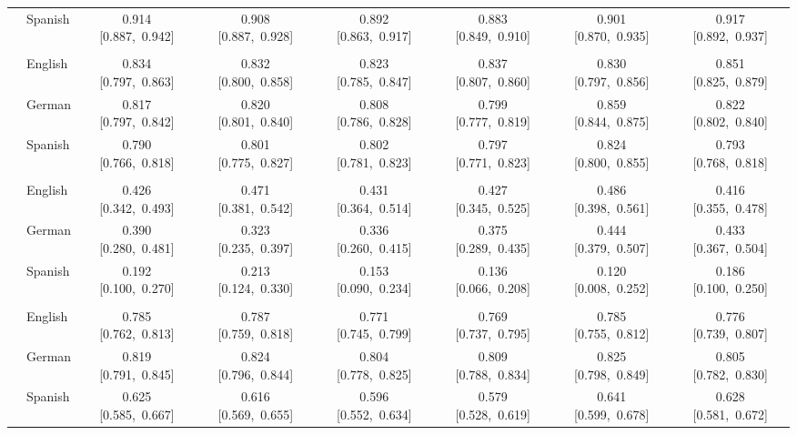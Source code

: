 \begin{longtable}[t]{llcccccc}
 & Spanish & 0.914 [0.887,~0.942] & 0.908 [0.887,~0.928] & 0.892 [0.863,~0.917] & 0.883 [0.849,~0.910] & 0.901 [0.870,~0.935] & 0.917 [0.892,~0.937]\\

\addlinespace[3pt]
\multicolumn{8}{p{\linewidth}}{\cellcolor[HTML]{DCDCDC}{classify the type of communication in tweets}}\\
\addlinespace & English & 0.834 [0.797,~0.863] & 0.832 [0.800,~0.858] & 0.823 [0.785,~0.847] & 0.837 [0.807,~0.860] & 0.830 [0.797,~0.856] & 0.851 [0.825,~0.879]\\

 & German & 0.817 [0.797,~0.842] & 0.820 [0.801,~0.840] & 0.808 [0.786,~0.828] & 0.799 [0.777,~0.819] & 0.859 [0.844,~0.875] & 0.822 [0.802,~0.840]\\

 & Spanish & 0.790 [0.766,~0.818] & 0.801 [0.775,~0.827] & 0.802 [0.781,~0.823] & 0.797 [0.771,~0.823] & 0.824 [0.800,~0.855] & 0.793 [0.768,~0.818]\\

\addlinespace[3pt]
\multicolumn{8}{p{\linewidth}}{\cellcolor[HTML]{DCDCDC}{detect impolite tweets}}\\
\addlinespace & English & 0.426 [0.342,~0.493] & 0.471 [0.381,~0.542] & 0.431 [0.364,~0.514] & 0.427 [0.345,~0.525] & 0.486 [0.398,~0.561] & 0.416 [0.355,~0.478]\\

 & German & 0.390 [0.280,~0.481] & 0.323 [0.235,~0.397] & 0.336 [0.260,~0.415] & 0.375 [0.289,~0.435] & 0.444 [0.379,~0.507] & 0.433 [0.367,~0.504]\\

 & Spanish & 0.192 [0.100,~0.270] & 0.213 [0.124,~0.330] & 0.153 [0.090,~0.234] & 0.136 [0.066,~0.208] & 0.120 [0.008,~0.252] & 0.186 [0.100,~0.250]\\

\addlinespace[3pt]
\multicolumn{8}{p{\linewidth}}{\cellcolor[HTML]{DCDCDC}{detect political tweets}}\\
\addlinespace & English & 0.785 [0.762,~0.813] & 0.787 [0.759,~0.818] & 0.771 [0.745,~0.799] & 0.769 [0.737,~0.795] & 0.785 [0.755,~0.812] & 0.776 [0.739,~0.807]\\

 & German & 0.819 [0.791,~0.845] & 0.824 [0.796,~0.844] & 0.804 [0.778,~0.825] & 0.809 [0.788,~0.834] & 0.825 [0.798,~0.849] & 0.805 [0.782,~0.830]\\

 & Spanish & 0.625 [0.585,~0.667] & 0.616 [0.569,~0.655] & 0.596 [0.552,~0.634] & 0.579 [0.528,~0.619] & 0.641 [0.599,~0.678] & 0.628 [0.581,~0.672]\\*
\end{longtable}
\endgroup{}
\endgroup{}
